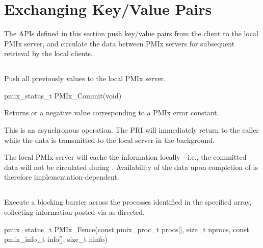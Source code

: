 \section{Exchanging Key/Value Pairs}
\label{chap:api_kv_mgmt:exchange}

The APIs defined in this section push key/value pairs from the client to the local \ac{PMIx} server, and circulate the data between \ac{PMIx} servers for subsequent retrieval by the local clients.

\subsection{}

\summary

Push all previously  values to the local PMIx server.

\format

\cspecificstart
\begin{codepar}
pmix_status_t PMIx_Commit(void)
\end{codepar}
\cspecificend

Returns  or a negative value corresponding to a PMIx error constant.

\descr

This is an asynchronous operation.
The \ac{PRI} will immediately return to the caller while the data is transmitted to the local server in the background.

\adviceuserstart
The local PMIx server will cache the information locally - i.e., the committed data will not be circulated during .
Availability of the data upon completion of  is therefore implementation-dependent.
\adviceuserend


\subsection{}

\summary

Execute a blocking barrier across the processes identified in the specified array, collecting information posted via  as directed.

\format

\cspecificstart
\begin{codepar}
pmix_status_t
PMIx_Fence(const pmix_proc_t procs[], size_t nprocs,
           const pmix_info_t info[], size_t ninfo)
\end{codepar}
\cspecificend

